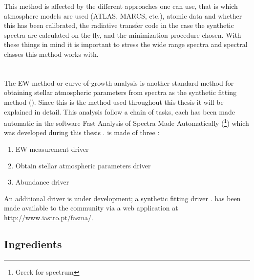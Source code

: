 This method is affected by the different approaches one can use, that is which atmosphere models are
used (ATLAS, MARCS, etc.), atomic data and whether this has been calibrated, the radiative transfer
code in the case the synthetic spectra are calculated on the fly, and the minimization procedure
chosen. With these things in mind it is important to stress the wide range spectra and spectral
classes this method works with.




\section{}
\label{sec:parameters}

The EW method or curve-of-growth analysis is another standard method for obtaining stellar
atmospheric parameters from spectra as the synthetic fitting method (). Since
this is the method used throughout this thesis it will be explained in detail. This analysis follow
a chain of tasks, each has been made automatic in the software Fast Analysis of Spectra Made
Automatically (\footnote{Greek for spectrum}) which was developed during this thesis
\citep{Andreasen2017a}.  is made of three :
\begin{enumerate}
  \item EW measurement driver
  \item Obtain stellar atmospheric parameters driver
  \item Abundance driver
\end{enumerate}
An additional driver is under development; a synthetic fitting driver \citep{Tsantaki2017}.
 has been made available to the community via a web application at
\url{http://www.iastro.pt/fasma/}.


\subsection{Ingredients}


